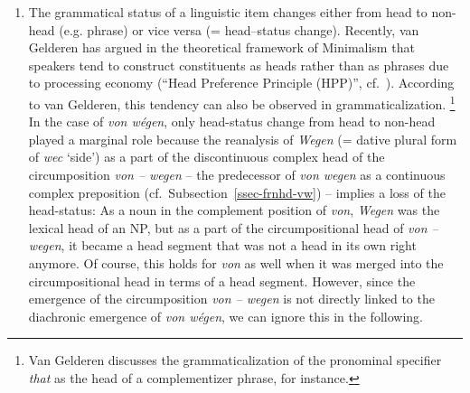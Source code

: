 \documentclass[output=paper
  ,nobabel
  ,draftmode
  ,babelshorthands
  ,colorlinks, citecolor=brown
]{langscibook}
\begin{document}
\begin{enumerate}
\item The grammatical status of a linguistic item changes either from head to non-head (e.g. phrase) or vice versa (= head--status change). Recently, van Gelderen has argued in the theoretical framework of Minimalism that speakers tend to construct constituents as heads rather than as phrases due to processing economy (``Head Preference Principle (HPP)'', cf.\ \citealp[13–14]{VanGelderen2011}).
    According to van Gelderen, this tendency can also be observed in grammaticalization.%
\footnote{Van Gelderen discusses the grammaticalization of the pronominal specifier \emph{that} as the head of a complementizer phrase, for instance.}
    In the case of \emph{von wégen}, only head-status change from head to non-head played a marginal role because the reanalysis of \emph{Wegen} (= dative plural form of \emph{wec} `side') as a part of the discontinuous complex head of the circumposition \emph{von – wegen} – the predecessor of \emph{von wegen} as a continuous complex preposition (cf.\ Subsection~\ref{ssec-frnhd-vw}) – implies a loss of the head-status: As a noun in the complement position of \emph{von}, \emph{Wegen} was the lexical head of an NP, but as a part of the circumpositional head of \emph{von – wegen}, it became a head segment that was not a head in its own right anymore. Of course, this holds for \emph{von} as well when it was merged into the circumpositional head in terms of a head segment. However, since the emergence of the circumposition \emph{von – wegen} is not directly linked to the diachronic emergence of \emph{von wégen}, we can ignore this in the following.


\end{enumerate}
\end{document}

